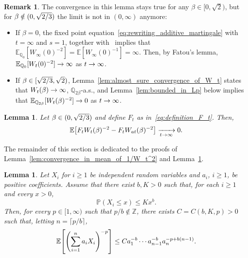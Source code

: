 \documentclass[10pt]{amsart}
\newtheorem{lemm}[theo]{Lemma}\newtheorem{prop}[theo]{Proposition}\newtheorem{coro}[theo]{Corollary}\newtheorem{conj}[theo]{Conjecture}
\theoremstyle{definition}\newtheorem{defi}[theo]{Definition}\newtheorem{rema}[theo]{Remark}\newtheorem{exam}[theo]{Example}\newtheorem{exem}[theo]{Example}\newtheorem{nota}[theo]{Notation}
\newcommand{\E}{\mathbb{E}}
\renewcommand{\P}{\mathbb{P}}
\newcommand{\Q}{\mathbb{Q}}
\newcommand{\Z}{\mathbb{Z}}
\newcommand\1{\mathds{1}}
\newcommand{\Expec}[1]{\mathbb{E}\left[#1\right]}
\let\originalleft\left
\let\originalright\right
\renewcommand{\left}{\mathopen{}\mathclose\bgroup\originalleft}
\renewcommand{\right}{\aftergroup\egroup\originalright}
\renewcommand*{\to}{\mathchoice{\longrightarrow}{\rightarrow}{\rightarrow}{\rightarrow}}
\begin{document}
\begin{rema}\label{rem:mean_of_ratios}
The convergence in this lemma stays true for any $\beta \in [0, \sqrt{2})$, but for $\beta \notin (0, \sqrt{2\smash{/}3})$ the limit is not in $(0,\infty)$ anymore:
\begin{itemize}
\item If $\beta = 0$, the fixed point equation~\eqref{eq:rewriting_additive_martingale} with $t=\infty$ and $s=1$, together with~\cite[Theorem~2.4]{Liu2001} implies that $\E_{\Q_0}[W_\infty(0)^{-2}] = \E [W_\infty(0)^{-1}] = \infty$. Then, by Fatou's lemma, $\E_{\Q_0}[W_t(0)^{-2}] \to \infty$ as $t \to \infty$.
\item If $\beta \in [\sqrt{2\smash{/}3}, \sqrt{2})$, Lemma~\ref{lem:almost_sure_convergence_of_W_t} states that $W_t(\beta) \to \infty$, $\Q_{2\beta}$-a.s., and Lemma~\ref{lem:bounded_in_Lp} below implies that $\E_{\Q_{2\beta}}[W_t(\beta)^{-2}] \to 0$ as $t \to \infty$.
\end{itemize}
\end{rema}

\begin{lemm}\label{lem:replacement_of_the_denominator}
Let $\beta \in (0, \sqrt{2\smash{/}3})$ and define $F_t$ as in~\eqref{eq:definition_F_t}. Then,
\begin{equation*}
\E \left[F_t W_t(\beta)^{-2} - F_t W_{at}(\beta)^{-2} \right] \xrightarrow[t \to \infty]{} 0.
\end{equation*}
\end{lemm}

The remainder of this section is dedicated to the proofs of Lemma~\ref{lem:convergence_in_mean_of_1/W_t^2} and Lemma~\ref{lem:replacement_of_the_denominator}.

\begin{lemm}\label{lem:negative_moments_linear_combination}
Let $X_i$ for $i \geq 1$ be independent random variables and $a_i$, $i \geq 1$, be positive coefficients. Assume that there exist $b, K > 0$ such that, for each $i \geq 1$ and every $x > 0$,
\begin{equation*}
\P(X_i \leq x) \leq K x^b.
\end{equation*}
Then, for every $p \in [1, \infty)$ such that $p/b \notin \Z$, there exists $C = C(b,K,p) >0$ such that, letting $n = \lceil p/b \rceil$,
\begin{equation*}
\Expec{\left(\sum_{i = 1}^n a_i X_i \right)^{-p}} \leq C a_1^{-b} \cdots a_{n - 1}^{-b} a_n^{-p + b(n - 1)}.
\end{equation*}
\end{lemm}
\end{document}
